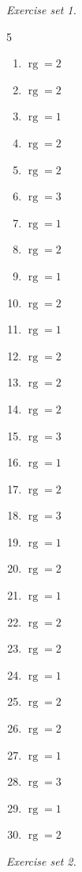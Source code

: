 \par\noindent\emph{Exercise set 1.}\nopagebreak
\begin{multicols}{5}\raggedright
\begin{enumerate}[label=\arabic*., leftmargin=*, itemsep=1pt]
\item $\operatorname{rg}=2$
\item $\operatorname{rg}=2$
\item $\operatorname{rg}=1$
\item $\operatorname{rg}=2$
\item $\operatorname{rg}=2$
\item $\operatorname{rg}=3$
\item $\operatorname{rg}=1$
\item $\operatorname{rg}=2$
\item $\operatorname{rg}=1$
\item $\operatorname{rg}=2$
\item $\operatorname{rg}=1$
\item $\operatorname{rg}=2$
\item $\operatorname{rg}=2$
\item $\operatorname{rg}=2$
\item $\operatorname{rg}=3$
\item $\operatorname{rg}=1$
\item $\operatorname{rg}=2$
\item $\operatorname{rg}=3$
\item $\operatorname{rg}=1$
\item $\operatorname{rg}=2$
\item $\operatorname{rg}=1$
\item $\operatorname{rg}=2$
\item $\operatorname{rg}=2$
\item $\operatorname{rg}=1$
\item $\operatorname{rg}=2$
\item $\operatorname{rg}=2$
\item $\operatorname{rg}=1$
\item $\operatorname{rg}=3$
\item $\operatorname{rg}=1$
\item $\operatorname{rg}=2$
\end{enumerate}
\end{multicols}
\par\noindent\emph{Exercise set 2.}\nopagebreak
